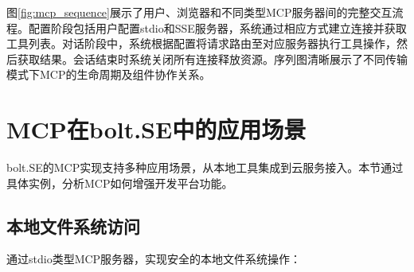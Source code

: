     
    
    
    
    
    

图\ref{fig:mcp_sequence}展示了用户、浏览器和不同类型MCP服务器间的完整交互流程。配置阶段包括用户配置stdio和SSE服务器，系统通过相应方式建立连接并获取工具列表。对话阶段中，系统根据配置将请求路由至对应服务器执行工具操作，然后获取结果。会话结束时系统关闭所有连接释放资源。序列图清晰展示了不同传输模式下MCP的生命周期及组件协作关系。

\section{MCP在bolt.SE中的应用场景}

bolt.SE的MCP实现支持多种应用场景，从本地工具集成到云服务接入。本节通过具体实例，分析MCP如何增强开发平台功能。

\subsection{本地文件系统访问}

通过stdio类型MCP服务器，实现安全的本地文件系统操作：

